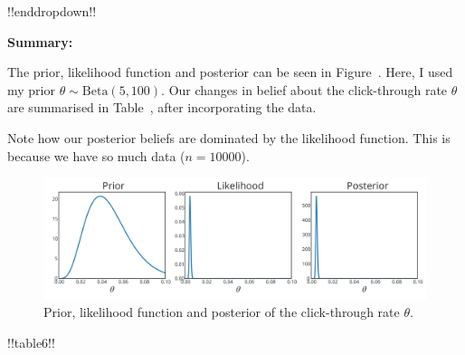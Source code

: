 {!!enddropdown!!

\textbf{Summary:} 

The prior, likelihood function and posterior can be seen in Figure~. Here, I used my prior $\theta \sim \mathrm{Beta}(5,100)$. Our changes in belief about the click-through rate $\theta$ are summarised in Table~, after incorporating the data.

Note how our posterior beliefs are dominated by the likelihood function. This is because we have so much data ($n = 10000$). 

\begin{figure}[h] 

\includegraphics{images/clickthroughrate_priorposterior.svg}
\caption{Prior, likelihood function and posterior of the click-through rate $\theta$.}


\end{figure}}



!!table6!!

\clearpage

